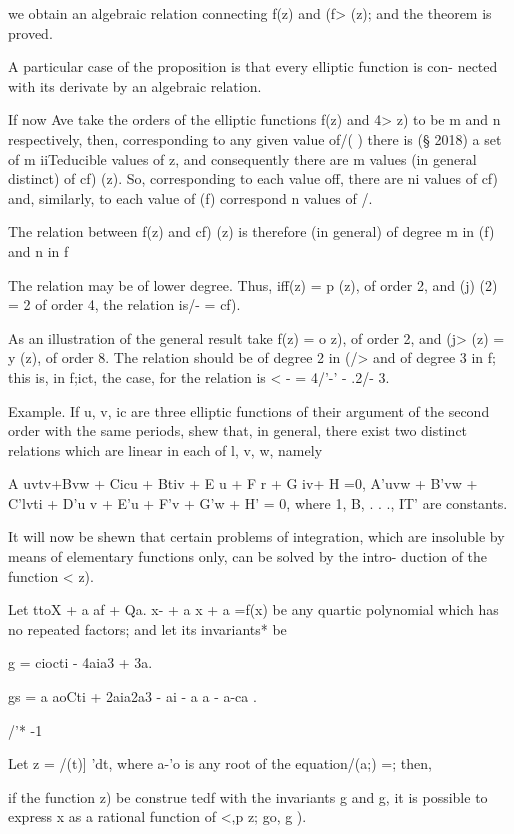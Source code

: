 {we obtain an algebraic relation connecting f(z) and (f> (z); and the
theorem is proved.

A particular case of the proposition is that every elliptic function
is con- nected with its derivate by an algebraic relation.

If now Ave take the orders of the elliptic functions f(z) and 4> z) to
be m and n respectively, then, corresponding to any given value of/( )
there is (§ 2018) a set of m iiTeducible values of z, and consequently
there are m values (in general distinct) of cf) (z). So, corresponding
to each value off, there are ni values of cf) and, similarly, to each
value of (f) correspond n values of /.

The relation between f(z) and cf) (z) is therefore (in general) of
degree m in (f) and n in f

The relation may be of lower degree. Thus, iff(z) = p (z), of order 2,
and (j) (2) = 2 of order 4, the relation is/- = cf).

As an illustration of the general result take f(z) = o z), of order 2,
and (j> (z) = y (z), of order 8. The relation should be of degree 2 in
(/> and of degree 3 in f; this is, in f;ict, the case, for the
relation is < - = 4/'-' - .2/- 3.

Example. If u, v, ic are three elliptic functions of their argument of
the second order with the same periods, shew that, in general, there
exist two distinct relations which are linear in each of l, v, w,
namely

A uvtv+Bvw + Cicu + Btiv + E u + F r + G iv+ H =0, A'uvw + B'vw +
C'lvti + D'u v + E'u + F'v + G'w + H' = 0, where 1, B, . . ., IT'
are constants.


It will now be shewn that certain problems of integration, which are
insoluble by means of elementary functions only, can be solved by the
intro- duction of the function < z).

%
%

Let ttoX + a af + Qa. x- + a x + a =f(x) be any quartic polynomial
which has no repeated factors; and let its invariants* be

g = ciocti - 4aia3 + 3a.

gs = a aoCti + 2aia2a3 - ai - a a - a-ca .

/'* -1

Let z = /(t)] 'dt, where a-'o is any root of the equation/(a;) =;
then,

if the function z) be construe tedf with the invariants g and g, it
is possible to express x as a rational function of <,p z; go, g ).

}
